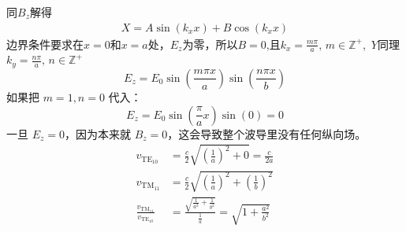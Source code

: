 同$B_z$解得
\begin{align*}
    X=A\sin(k_xx)+B\cos(k_xx)
\end{align*}
边界条件要求在$x=0$和$x=a$处，$E_z$为零，所以$B=0$,且$k_x=\frac{m\pi}{a},\, m\in \mathbb{Z}^+$,\, $Y$同理$k_y=\frac{n\pi}{a},\, n\in \mathbb{Z}^+$
\begin{equation}
    E_z=E_0\sin\left(\frac{m\pi x}{a}\right)\sin\left(\frac{n\pi x}{b}\right)
\end{equation}
如果把 $m=1, n=0$ 代入：$$E_z = E_0 \sin\left(\frac{\pi}{a}x\right) \sin(0) = 0$$一旦 $E_z = 0$，因为本来就 $B_z = 0$，这会导致整个波导里没有任何纵向场。
\begin{align*}
    v_{\text{TE}_{10}} &= \frac{c}{2} \sqrt{\left(\frac{1}{a}\right)^2 + 0} = \frac{c}{2a}\\
    v_{\text{TM}_{11}} &= \frac{c}{2} \sqrt{\left(\frac{1}{a}\right)^2 + \left(\frac{1}{b}\right)^2}\\
    \frac{v_{\text{TM}_{11}}}{v_{\text{TE}_{10}}} &= \frac{\sqrt{\frac{1}{a^2} + \frac{1}{b^2}}}{\frac{1}{a}}=\sqrt{1+\frac{a^2}{b^2}}
\end{align*}
